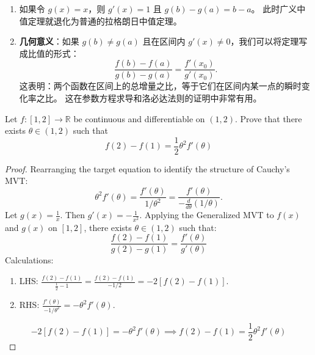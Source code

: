 \documentclass[
	UTF-8,
	11pt, %
	a4paper, %
]{LegrandOrangeBook}
\begin{document}
    \begin{remark}
    \begin{enumerate}
        \item 如果令 $g(x) = x$，则 $g'(x) = 1$ 且 $g(b) - g(a) = b - a$。
        此时广义中值定理就退化为普通的拉格朗日中值定理。
        \item \textbf{几何意义}：如果 $g(b) \neq g(a)$ 且在区间内 $g'(x) \neq 0$，我们可以将定理写成比值的形式：
        \[ \frac{f(b) - f(a)}{g(b) - g(a)} = \frac{f'(x_0)}{g'(x_0)}. \]
        这表明：两个函数在区间上的总增量之比，等于它们在区间内某一点的瞬时变化率之比。
        这在参数方程求导和洛必达法则的证明中非常有用。
    \end{enumerate}
    \end{remark}

    \newpage

    \begin{example}
    Let $f: [1, 2] \to \mathbb{R}$ be continuous and differentiable on $(1, 2)$. Prove that there exists $\theta \in (1, 2)$ such that
    \[ f(2) - f(1) = \frac{1}{2}\theta^2 f'(\theta) \]
    \begin{proof}
            Rearranging the target equation to identify the structure of Cauchy's MVT:
    \[ \theta^2 f'(\theta) = \frac{f'(\theta)}{1/\theta^2} = \frac{f'(\theta)}{-\frac{d}{d\theta}(1/\theta)}. \]
    Let $g(x) = \frac{1}{x}$. Then $g'(x) = -\frac{1}{x^2}$.
    Applying the Generalized MVT to $f(x)$ and $g(x)$ on $[1, 2]$, there exists $\theta \in (1, 2)$ such that:
    \[ \frac{f(2) - f(1)}{g(2) - g(1)} = \frac{f'(\theta)}{g'(\theta)} \]
    Calculations:
    \begin{enumerate}
        \item LHS: $\frac{f(2) - f(1)}{\frac{1}{2} - 1} = \frac{f(2) - f(1)}{-1/2} = -2[f(2) - f(1)]$.
        \item RHS: $\frac{f'(\theta)}{-1/\theta^2} = -\theta^2 f'(\theta)$.
    \end{enumerate}
    \[ -2[f(2) - f(1)] = -\theta^2 f'(\theta) \implies f(2) - f(1) = \frac{1}{2}\theta^2 f'(\theta) \]

    \end{proof}
    \end{example}
\end{document}
